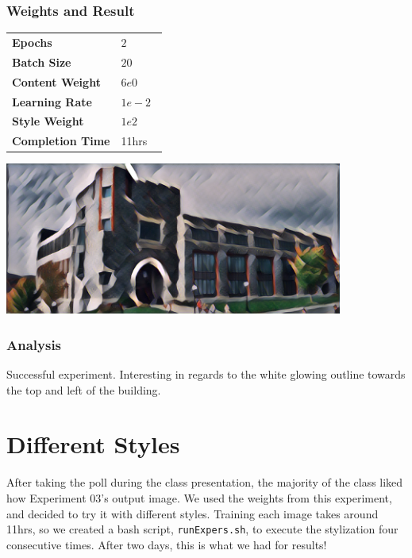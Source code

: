 \documentclass[12pt]{article}
\begin{document}
\subsubsection{Weights and Result}
\begin{minipage}[t]{0.4\textwidth}
\begin{tabular}{l l}
    \textbf{Epochs}          & $2$     \\
    \textbf{Batch Size}      & $20$    \\
    \textbf{Content Weight}  & $6e0$ \\
    \textbf{Learning Rate}   & $1e-2$  \\
    \textbf{Style Weight}    & $1e2$   \\
    \textbf{Completion Time} & 11hrs \
\vspace{3.5cm}\\
\end{tabular}
\end{minipage}
\begin{minipage}{0.1\textwidth}
\end{minipage}
\begin{minipage}[t]{0.6\textwidth}
\includegraphics[height=50mm]{visuals/results/03.png}
\end{minipage} \vspace{-3cm}
\subsubsection{Analysis}
Successful experiment. Interesting in regards to the white glowing outline towards the top and left of the building.

\section{Different Styles}
After taking the poll during the class presentation, the majority of the class liked how Experiment 03's output image. We used the weights from this experiment, and decided to try it with different styles. Training each image takes around 11hrs, so we created a bash script, \texttt{runExpers.sh}, to execute the stylization four consecutive times. After two days, this is what we had for results!
\end{document}
